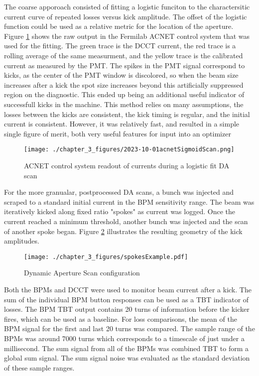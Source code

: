 The coarse apporoach consisted of fitting a logistic funciton to the charactersitic current curve of repeated losses versus kick amplitude. The offset of the logistic function could be used as a relative metric for the location of the aperture. Figure \ref{fig:acnetDA} shows the raw output in the Fermilab ACNET control system that was used for the fitting. The green trace is the DCCT current, the red trace is a rolling average of the same measurment, and the yellow trace is the calibrated current as measured by the PMT. The spikes in the PMT signal correspond to kicks, as the center of the PMT window is discolored, so when the beam size increases after a kick the spot size increases beyond this artificially suppressed region on the diagnostic. This ended up being an additional useful indicator of successfull kicks in the machine. This method relies on many assumptions, the losses between the kicks are consistent, the kick timing is regular, and the initial current is consistent. However, it was relatively fast, and resulted in a simple single figure of merit, both very useful features for input into an optimizer

\begin{figure}
	\centering
	\texttt{[image: ./chapter\_3\_figures/2023-10-01acnetSigmoidScan.png]}
	\caption{ACNET control system readout of currents during a logistic fit DA scan}
	\label{fig:acnetDA}
\end{figure}

For the more granualar, postprocessed DA scans, a bunch was injected and scraped to a standard initial current in the BPM sensitivity range. The beam was iteratively kicked along fixed ratio "spokes" as current was logged. Once the current reached a minimum threshold, another bunch was injected and the scan of another spoke began.  Figure \ref{fig:spokes} illustrates the resulting geometry of the kick amplitudes.

\begin{figure}
	\centering
	\texttt{[image: ./chapter\_3\_figures/spokesExample.pdf]}
	\caption{Dynamic Aperture Scan configuration}
	\label{fig:spokes}
\end{figure}

Both the BPMs and DCCT were used to monitor beam current after a kick. The sum of the individual BPM button responses can be used as a TBT indicator of losses. The BPM TBT output contains 20 turns of information before the kicker fires, which can be used as a baseline. For loss comparisons, the mean of the BPM signal for the first and last 20 turns was compared. The sample range of the BPMs was around 7000 turns which corresponds to a timescale of just under a millisecond. The sum signal from all of the BPMs was combined TBT to form a global sum signal. The sum signal noise was evaluated as the standard deviation of these sample ranges. 

